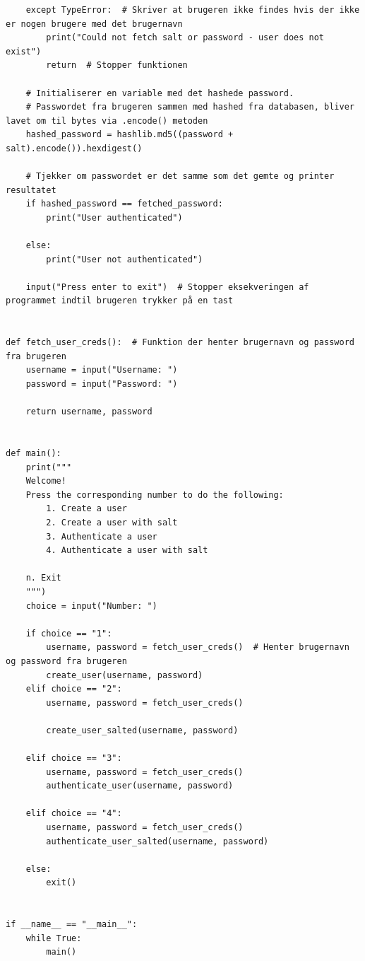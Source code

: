 \documentclass[12pt]{article}
\begin{document}
\begin{verbatim}
    except TypeError:  # Skriver at brugeren ikke findes hvis der ikke er nogen brugere med det brugernavn
        print("Could not fetch salt or password - user does not exist")
        return  # Stopper funktionen

    # Initialiserer en variable med det hashede password.
    # Passwordet fra brugeren sammen med hashed fra databasen, bliver lavet om til bytes via .encode() metoden
    hashed_password = hashlib.md5((password + salt).encode()).hexdigest()

    # Tjekker om passwordet er det samme som det gemte og printer resultatet
    if hashed_password == fetched_password:
        print("User authenticated")

    else:
        print("User not authenticated")

    input("Press enter to exit")  # Stopper eksekveringen af programmet indtil brugeren trykker på en tast


def fetch_user_creds():  # Funktion der henter brugernavn og password fra brugeren
    username = input("Username: ")
    password = input("Password: ")

    return username, password


def main():
    print("""
    Welcome!
    Press the corresponding number to do the following:
        1. Create a user
        2. Create a user with salt
        3. Authenticate a user
        4. Authenticate a user with salt
    
    n. Exit
    """)
    choice = input("Number: ")

    if choice == "1":
        username, password = fetch_user_creds()  # Henter brugernavn og password fra brugeren
        create_user(username, password)
    elif choice == "2":
        username, password = fetch_user_creds()

        create_user_salted(username, password)

    elif choice == "3":
        username, password = fetch_user_creds()
        authenticate_user(username, password)

    elif choice == "4":
        username, password = fetch_user_creds()
        authenticate_user_salted(username, password)

    else:
        exit()


if __name__ == "__main__":
    while True:
        main()


    
\end{verbatim}
\end{document}
